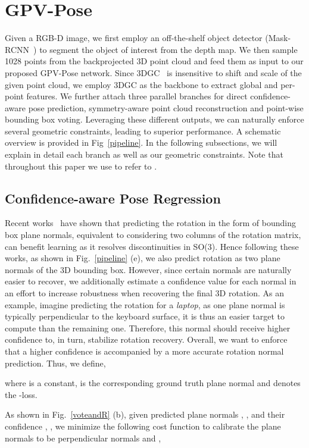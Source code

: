 \documentclass[10pt,twocolumn,letterpaper]{article}
\begin{document}
\section{GPV-Pose}
Given a RGB-D image, we first employ an off-the-shelf object detector (\eg Mask-RCNN~\cite{maskrcnn}) to segment the object of interest from the depth map.
We then sample 1028 points from the backprojected 3D point cloud and feed them as input to our proposed GPV-Pose network.
Since 3DGC~\cite{3DGC} is insensitive to shift and scale of the given point cloud, we employ 3DGC as the backbone to extract global and per-point features.
We further attach three parallel branches for direct confidence-aware pose prediction, symmetry-aware point cloud reconstruction and point-wise bounding box voting.
Leveraging these different outputs, we can naturally enforce several geometric constraints, leading to superior performance. A schematic overview is provided in Fig~\ref{pipeline}.
In the following subsections, we will explain in detail each branch as well as our geometric constraints. 
Note that throughout this paper we use  to refer to .

\subsection{Confidence-aware Pose Regression}
Recent works~\cite{zhou2019continuity, fs-net} have shown that predicting the rotation in the form of bounding box plane normals, \ie equivalent to considering two columns of the rotation matrix, can benefit learning as it resolves discontinuities in SO(3).
Hence following these works, as shown in Fig.~\ref{pipeline} (e), we also predict rotation as two plane normals of the 3D bounding box.
However, since certain normals are naturally easier to recover, we additionally estimate a confidence value for each normal in an effort to increase robustness when recovering the final 3D rotation.
As an example, imagine predicting the rotation for a \textit{laptop}, as one plane normal is typically perpendicular to the keyboard surface, it is thus an easier target to compute than the remaining one.
Therefore, this normal should receive higher confidence to, in turn, stabilize rotation recovery.
Overall, we want to enforce that a higher confidence is accompanied by a more accurate rotation normal prediction. 
Thus, we define,

where  is a constant,  is the corresponding ground truth plane normal and
 denotes the -loss.


As shown in Fig.~\ref{voteandR} (b), given predicted plane normals , , and their confidence , , we minimize the following cost function to calibrate the plane normals to be perpendicular normals  and ,
\end{document}
